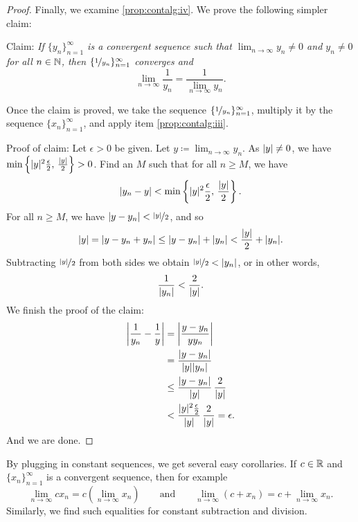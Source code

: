 \begin{proof}
Finally, we examine
\ref{prop:contalg:iv}.
We prove the following simpler claim:

Claim: \emph{If $\{ y_n \}_{n=1}^\infty$ is a convergent sequence such that
$\lim_{n\to\infty} y_n \neq 0$ and $y_n \neq 0$ for all $n \in {\mathbb{N}}$, then
$\{ \nicefrac{1}{y_n} \}_{n=1}^\infty$ converges and}
\begin{equation*}
\lim_{n\to\infty} \frac{1}{y_n} = \frac{1}{\lim_{n\to\infty} y_n}  .
\end{equation*}

Once the claim is proved, we take the sequence
$\{ \nicefrac{1}{y_n} \}_{n=1}^\infty$,
multiply it by the sequence $\{ x_n \}_{n=1}^\infty$, and apply item
\ref{prop:contalg:iii}.

Proof of claim:  Let $\epsilon > 0$ be given.
Let $y \coloneqq \lim_{n\to\infty} y_n$.
As $\lvert {y} \rvert \neq 0$, we have
$\min \left\{ \lvert {y} \rvert^2\frac{\epsilon}{2}, \, \frac{\lvert {y} \rvert}{2} \right\} > 0$.
Find an $M$ such that for all $n \geq M$,
we have
\begin{equation*}
\lvert {y_n - y} \rvert < \min \left\{ \lvert {y} \rvert^2\frac{\epsilon}{2}, \, \frac{\lvert {y} \rvert}{2}
\right\} .
\end{equation*}
For all $n \geq M$, we have
$\lvert {y - y_n} \rvert < \nicefrac{\lvert {y} \rvert}{2}$, and so
\begin{equation*}
\lvert {y} \rvert = 
\lvert {y - y_n + y_n } \rvert \leq
\lvert {y - y_n} \rvert + \lvert { y_n } \rvert < \frac{\lvert {y} \rvert}{2} + \lvert {y_n} \rvert.
\end{equation*}
Subtracting $\nicefrac{\lvert {y} \rvert}{2}$ from both sides we obtain
$\nicefrac{\lvert {y} \rvert}{2} < \lvert {y_n} \rvert$, or in other words,
\begin{equation*}
\frac{1}{\lvert {y_n} \rvert} < \frac{2}{\lvert {y} \rvert} .
\end{equation*}
We finish the proof of the claim:
\begin{equation*}
\begin{split}
\abs{\frac{1}{y_n} - \frac{1}{y}} &=
\abs{\frac{y - y_n}{y y_n}} \\
& =
\frac{\sabs{y - y_n}}{\sabs{y} \sabs{y_n}} \\
& \leq
\frac{\sabs{y - y_n}}{\sabs{y}} \, \frac{2}{\sabs{y}} \\
& <
\frac{\sabs{y}^2 \frac{\epsilon}{2}}{\sabs{y}} \, \frac{2}{\sabs{y}}
= \epsilon .
\end{split}
\avoidbreak
\end{equation*}
And we are done.
\end{proof}

By plugging in constant sequences, we get several easy corollaries.
If $c \in {\mathbb{R}}$ and $\{ x_n \}_{n=1}^\infty$ is a convergent sequence, then
for example
\begin{equation*}
\lim_{n \to \infty} c x_n = 
c \left( \lim_{n \to \infty} x_n \right) \qquad
\text{and}
\qquad
\lim_{n \to \infty} (c + x_n) = 
c + \lim_{n \to \infty} x_n .
\end{equation*}
Similarly, we find such equalities for constant subtraction and division.

